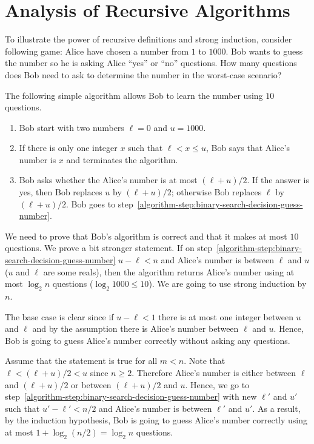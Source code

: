 \section{Analysis of Recursive Algorithms}
\label{section:strong-induction-recursive}
To illustrate the power of recursive definitions and strong induction, consider
following game: Alice have chosen a number from $1$ to $1000$. Bob wants to
guess the number so he is asking Alice ``yes'' or ``no'' questions.
How many questions does Bob need to ask to determine the number in the
worst-case scenario?

The following simple algorithm allows Bob to learn the number using $10$
questions.

\begin{enumerate}
  \item Bob start with two numbers $\ell = 0$ and $u = 1000$.
  \item \label{algorithm-step:binary-search-result-guess-number}
    If there is only one integer $x$ such that $\ell < x \le u$, Bob says that
    Alice's number is $x$ and terminates the algorithm.
  \item \label{algorithm-step:binary-search-decision-guess-number}
    Bob asks whether the Alice's number is at most $(\ell + u) / 2$. If the
    answer is yes, then Bob replaces $u$ by $(\ell + u) / 2$; otherwise Bob
    replaces $\ell$ by $(\ell + u) / 2$.
    Bob goes to step~\ref{algorithm-step:binary-search-decision-guess-number}.
\end{enumerate}

We need to prove that Bob's algorithm is correct and that it makes at most $10$
questions. We prove a bit stronger statement. If on
step~\ref{algorithm-step:binary-search-decision-guess-number} $u - \ell < n$ and
Alice's number is between $\ell$ and $u$ ($u$ and $\ell$ are some reals), then
the algorithm returns Alice's number using at most $\log_2 n$ questions 
($\log_2 1000 \le 10$). We are going to use strong induction by $n$. 

The base case is clear since if $u - \ell < 1$ there is at most one integer
between $u$ and $\ell$ and by the assumption there is Alice's number between
$\ell$ and $u$. Hence, Bob is going to guess Alice's number correctly without asking
any questions.

Assume that the statement is true for all $m < n$. Note that 
$\ell < (\ell + u) / 2 < u$ since $n \ge 2$. Therefore Alice's number is either
between $\ell$ and $(\ell + u) / 2$ or between $(\ell + u) / 2$ and $u$. Hence,
we go to step~\ref{algorithm-step:binary-search-decision-guess-number} with new
$\ell'$ and $u'$ such that $u' - \ell' < n / 2$ and Alice's number is between
$\ell'$ and $u'$. As a result, by the induction hypothesis, Bob is going to
guess Alice's number correctly using at most $1 + \log_2 (n / 2) = \log_2 n$
questions.

